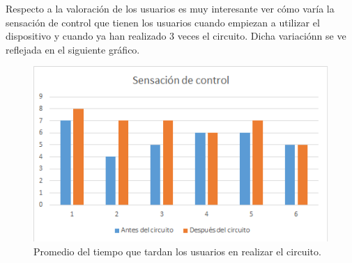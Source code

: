 \documentclass[twoside, 11pt]{epstfg}
\begin{document}
\begin{itemize}
\newpage
Respecto a la valoración de los usuarios es muy interesante ver cómo varía la sensación de control que tienen los usuarios cuando empiezan a utilizar el dispositivo y cuando ya han realizado 3 veces el circuito. Dicha variaciónn se ve reflejada en el siguiente gráfico.

\begin{figure}[H]
	\centerline{
		\mbox{\includegraphics[width=.85\textwidth]{images/SensacionControl.png}}
	}
	\caption{Promedio del tiempo que tardan los usuarios en realizar el circuito.}
\end{figure}



\end{itemize}
%
%
%
%
%
%
%
%
\end{document}
